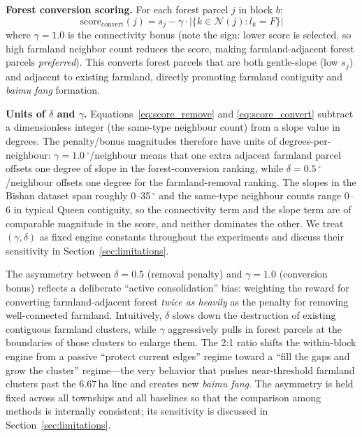 \documentclass[preprint,12pt]{elsarticle}
\begin{document}
\textbf{Forest conversion scoring.} For each forest parcel $j$ in block $b$:
\begin{equation}
\text{score}_{\text{convert}}(j) = s_j - \gamma \cdot |\{k \in \mathcal{N}(j) : l_k = F\}|
\label{eq:score_convert}
\end{equation}
where $\gamma = 1.0$ is the connectivity bonus (note the sign: lower score is selected, so high farmland neighbor count reduces the score, making farmland-adjacent forest parcels \textit{preferred}). This converts forest parcels that are both gentle-slope (low $s_j$) and adjacent to existing farmland, directly promoting farmland contiguity and \textit{baimu fang} formation.

\textbf{Units of $\delta$ and $\gamma$.} Equations~\ref{eq:score_remove} and \ref{eq:score_convert} subtract a dimensionless integer (the same-type neighbour count) from a slope value in degrees. The penalty/bonus magnitudes therefore have units of degrees-per-neighbour: $\gamma=1.0\,^\circ$/neighbour means that one extra adjacent farmland parcel offsets one degree of slope in the forest-conversion ranking, while $\delta=0.5\,^\circ$/neighbour offsets one degree for the farmland-removal ranking. The slopes in the Bishan dataset span roughly 0--35\,$^\circ$ and the same-type neighbour counts range 0--6 in typical Queen contiguity, so the connectivity term and the slope term are of comparable magnitude in the score, and neither dominates the other. We treat $(\gamma,\delta)$ as fixed engine constants throughout the experiments and discuss their sensitivity in Section~\ref{sec:limitations}.

The asymmetry between $\delta = 0.5$ (removal penalty) and $\gamma = 1.0$ (conversion bonus) reflects a deliberate ``active consolidation'' bias: weighting the reward for converting farmland-adjacent forest \textit{twice as heavily} as the penalty for removing well-connected farmland. Intuitively, $\delta$ slows down the destruction of existing contiguous farmland clusters, while $\gamma$ aggressively pulls in forest parcels at the boundaries of those clusters to enlarge them. The 2:1 ratio shifts the within-block engine from a passive ``protect current edges'' regime toward a ``fill the gaps and grow the cluster'' regime---the very behavior that pushes near-threshold farmland clusters past the 6.67\,ha line and creates new \textit{baimu fang}. The asymmetry is held fixed across all townships and all baselines so that the comparison among methods is internally consistent; its sensitivity is discussed in Section~\ref{sec:limitations}.
\end{document}
